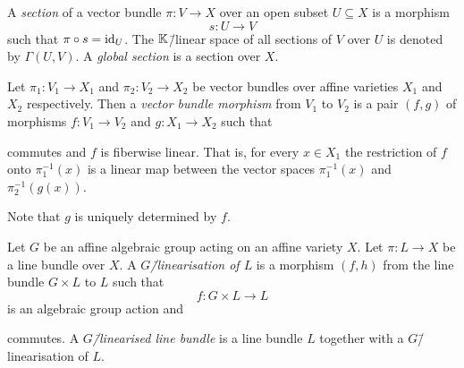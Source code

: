 \begin{defi}
	A \emph{section} of a vector bundle $\pi\colon V \rightarrow X$ over an open subset $U\subseteq X$ is a morphism
	$$s\colon U \longrightarrow V$$
	such that $\pi \circ s = \text{id}_U$. The $\mathbb{K}$\=/linear space of all sections of $V$ over $U$ is denoted by $\Gamma(U,V)$. A \emph{global section} is a section over $X$.
\end{defi}

\begin{defi}
	Let $\pi_1\colon V_1 \rightarrow X_1$ and $\pi_2\colon V_2 \rightarrow X_2$ be vector bundles over affine varieties $X_1$ and $X_2$ respectively. Then a \emph{vector bundle morphism} from $V_1$ to $V_2$ is a pair $(f,g)$ of morphisms $f\colon V_1 \rightarrow V_2$ and $g\colon X_1 \rightarrow X_2$ such that
	\begin{center}
	\end{center}
	commutes and $f$ is fiberwise linear. That is, for every $x\in X_1$ the restriction of $f$ onto $\pi_1^{-1}(x)$ is a linear map between the vector spaces $\pi_1^{-1}(x)$ and $\pi_2^{-1}(g(x))$.
	
	Note that $g$ is uniquely determined by $f$.
\end{defi}

\begin{defi}[$G$\=/linearisation of a line bundle, \phantom{}{\cite[chapter 1.3]{git}}]
	Let $G$ be an affine algebraic group acting on an affine variety $X$. Let $\pi\colon L \rightarrow X$ be a line bundle over $X$. A \emph{$G$\=/linearisation of $L$} is a morphism $(f,h)$ from the line bundle $G\times L$ to $L$ such that
	$$f\colon G\times L \longrightarrow L$$
	is an algebraic group action and
	\begin{center}
	\end{center}
	commutes. A \emph{$G$\=/linearised line bundle} is a line bundle $L$ together with a  $G$\=/linearisation of $L$.
\end{defi}

